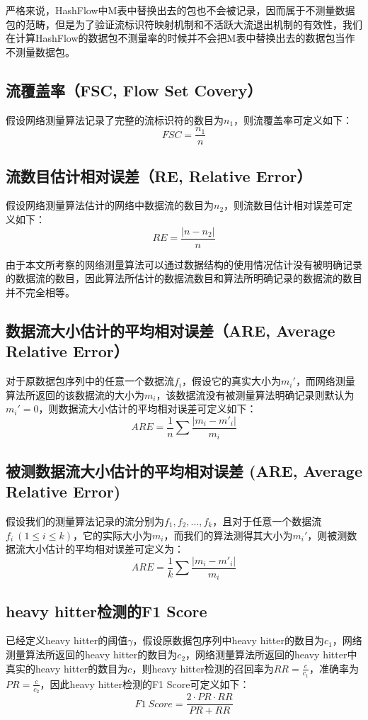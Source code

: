\documentclass{article}
\begin{document}
严格来说，HashFlow中M表中替换出去的包也不会被记录，因而属于不测量数据包的范畴，但是为了验证流标识符映射机制和不活跃大流退出机制的有效性，我们在计算HashFlow的数据包不测量率的时候并不会把M表中替换出去的数据包当作不测量数据包。

\subsection{ 流覆盖率（FSC, Flow Set Covery）}
假设网络测量算法记录了完整的流标识符的数目为$n_1$，则流覆盖率可定义如下：
$$
FSC = \frac{n_1}{n}
$$

\subsection{ 流数目估计相对误差（RE, Relative Error）}
假设网络测量算法估计的网络中数据流的数目为$n_2$，则流数目估计相对误差可定义如下：
$$
RE = \frac{|n - n_2|}{n}
$$

由于本文所考察的网络测量算法可以通过数据结构的使用情况估计没有被明确记录的数据流的数目，因此算法所估计的数据流数目和算法所明确记录的数据流的数目并不完全相等。

\subsection{ 数据流大小估计的平均相对误差（ARE, Average Relative Error）}
对于原数据包序列中的任意一个数据流$f_i$，假设它的真实大小为$m_i'$，而网络测量算法所返回的该数据流的大小为$m_i$，该数据流没有被测量算法明确记录则默认为$m_i'=0$，则数据流大小估计的平均相对误差可定义如下：
$$
ARE=\frac{1}{n}\sum\frac{|m_i - m'_i|}{m_i}
$$

\subsection{被测数据流大小估计的平均相对误差 (ARE, Average Relative Error)}
假设我们的测量算法记录的流分别为$f_1, f_2, ..., f_k$，且对于任意一个数据流$f_i ~(1 \le i \le k)$，它的实际大小为$m_i$，而我们的算法测得其大小为$m_i'$，则被测数据流大小估计的平均相对误差可定义为：
$$
ARE = \frac{1}{k}\sum\frac{|m_i - m'_i|}{m_i}
$$

\subsection{ heavy hitter检测的F1 Score}
已经定义heavy hitter的阈值$\gamma$，假设原数据包序列中heavy hitter的数目为$c_1$，网络测量算法所返回的heavy hitter的数目为$c_2$，网络测量算法所返回的heavy hitter中真实的heavy hitter的数目为$c$，则heavy hitter检测的召回率为$RR=\frac{c}{c_1}$，准确率为$PR=\frac{c}{c_2}$，因此heavy hitter检测的F1 Score可定义如下：
$$
F1~Score=\frac{2\cdot PR \cdot RR}{PR + RR}
$$
\end{document}
